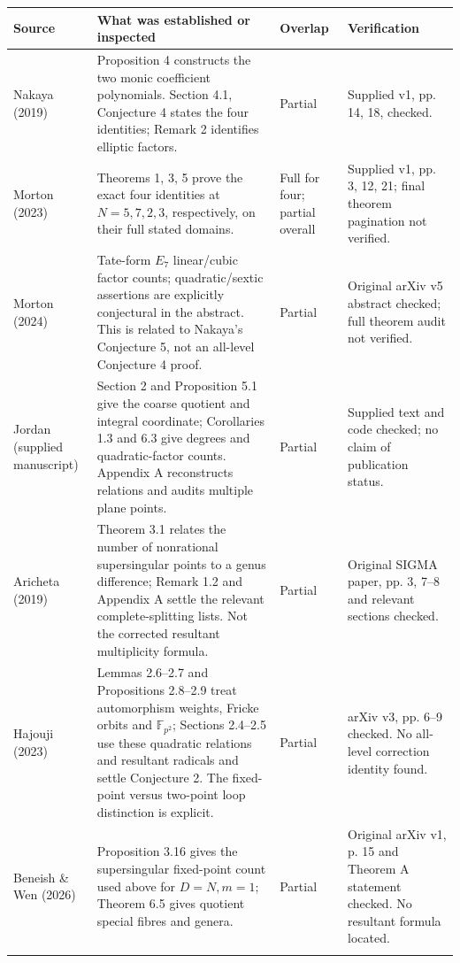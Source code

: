 \documentclass[11pt,a4paper]{article}
\begin{document}
\begin{longtable}{L{.19\linewidth}L{.45\linewidth}L{.10\linewidth}L{.16\linewidth}}
\toprule Source & What was established or inspected & Overlap & Verification\\\midrule\endhead
Nakaya (2019) & Proposition 4 constructs the two monic coefficient polynomials. Section 4.1, Conjecture 4 states the four identities; Remark 2 identifies elliptic factors. & Partial & Supplied v1, pp. 14, 18, checked.\\\addlinespace
Morton (2023) & Theorems 1, 3, 5 prove the exact four identities at $N=5,7,2,3$, respectively, on their full stated domains. & Full for four; partial overall & Supplied v1, pp. 3, 12, 21; final theorem pagination not verified.\\\addlinespace
Morton (2024) & Tate-form $E_7$ linear/cubic factor counts; quadratic/sextic assertions are explicitly conjectural in the abstract. This is related to Nakaya's Conjecture 5, not an all-level Conjecture 4 proof. & Partial & Original arXiv v5 abstract checked; full theorem audit not verified.\\\addlinespace
Jordan (supplied manuscript) & Section 2 and Proposition 5.1 give the coarse quotient and integral coordinate; Corollaries 1.3 and 6.3 give degrees and quadratic-factor counts. Appendix A reconstructs relations and audits multiple plane points. & Partial & Supplied text and code checked; no claim of publication status.\\\addlinespace
Aricheta (2019) & Theorem 3.1 relates the number of nonrational supersingular points to a genus difference; Remark 1.2 and Appendix A settle the relevant complete-splitting lists. Not the corrected resultant multiplicity formula. & Partial & Original SIGMA paper, pp. 3, 7--8 and relevant sections checked.\\\addlinespace
Hajouji (2023) & Lemmas 2.6--2.7 and Propositions 2.8--2.9 treat automorphism weights, Fricke orbits and $\mathbb F_{p^2}$; Sections 2.4--2.5 use these quadratic relations and resultant radicals and settle Conjecture 2. The fixed-point versus two-point loop distinction is explicit. & Partial & arXiv v3, pp. 6--9 checked. No all-level correction identity found.\\\addlinespace
Beneish \& Wen (2026) & Proposition 3.16 gives the supersingular fixed-point count used above for $D=N,m=1$; Theorem 6.5 gives quotient special fibres and genera. & Partial & Original arXiv v1, p. 15 and Theorem A statement checked. No resultant formula located.\\\addlinespace

\end{longtable}
\end{document}
